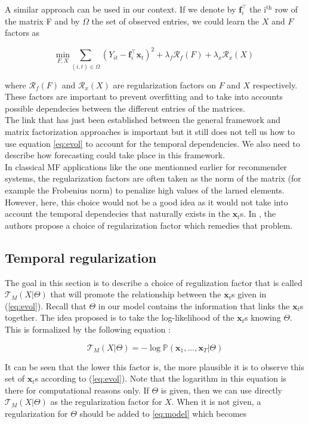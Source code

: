 \documentclass{article}
\begin{document}
A similar approach can be used in our context. If we denote by $\mathbf{f}_i^\top$ the i$^\text{th}$ row of the matrix F and by $\Omega$ the set of observed entries, we could learn the $X$ and $F$ factors as

\begin{equation}
\underset{F,X}{\text{min}} \sum_{(i,t) \in \Omega} (Y_{it} - \mathbf{f}_i^\top\mathbf{x}_t)^2 + \lambda_f \mathcal{R}_f(F) + \lambda_x \mathcal{R}_x(X)
\label{eq:model}
\end{equation}

where $\mathcal{R}_f(F)$ and $\mathcal{R}_x(X)$ are regularization factors on $F$ and $X$ respectively. These factors are important to prevent overfitting and to take into accounts possible dependecies between the different entries of the matrices. \\
The link that has just been established between the general framework and matrix factorization approaches is important but it still does not tell us how to use equation \ref{eq:evol} to account for the temporal dependencies. We also need to describe how forecasting could take place in this framework. \\
In classical MF applications like the one mentionned earlier for recommender systems, the regularization factors are often taken as the norm of the matrix (for example the Frobenius norm) to penalize high values of the larned elements. However, here, this choice would not be a good idea as it would not take into account the temporal dependecies that naturally exists in the $\mathbf{x}_t$s. In \cite{TRMF}, the authors propose a choice of regularization factor which remedies that problem.

\subsection*{Temporal regularization}

The goal in this section is to describe a choice of regulization factor that is called $\mathcal{T}_M(X | \Theta)$ that will promote the relationship between the $\mathbf{x}_t$s given in (\ref{eq:evol}).
Recall that $\Theta$ in our model contains the information that links the $\mathbf{x}_t$s together. The idea proposed is to take the log-likelihood of the $\mathbf{x}_t$s knowing $\Theta$. This is formalized by the following equation :

$$\mathcal{T}_M(X | \Theta) = -\log{\mathbb{P}(\mathbf{x}_1, ..., \mathbf{x}_T|\Theta)}$$

It can be seen that the lower this factor is, the more plausible it is to observe this set of $\mathbf{x}_t$s according to (\ref{eq:evol}). Note that the logarithm in this equation is there for computational reasons only. If $\Theta$ is given, then we can use directly $\mathcal{T}_M(X | \Theta)$ as the regularization factor for $X$. When it is not given, a regularization for $\Theta$ should be added to \ref{eq:model} which becomes
\end{document}
